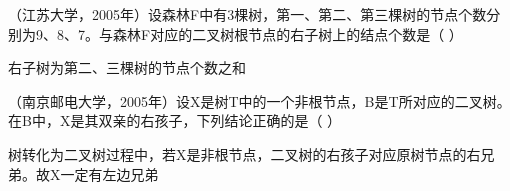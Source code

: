 \question （江苏大学，2005年）设森林F中有3棵树，第一、第二、第三棵树的节点个数分别为9、8、7。与森林F对应的二叉树根节点的右子树上的结点个数是（
）
\par{}
\begin{solution}右子树为第二、三棵树的节点个数之和
\end{solution}
\question （南京邮电大学，2005年）设X是树T中的一个非根节点，B是T所对应的二叉树。在B中，X是其双亲的右孩子，下列结论正确的是（
）
\par{}
\begin{solution}树转化为二叉树过程中，若X是非根节点，二叉树的右孩子对应原树节点的右兄弟。故X一定有左边兄弟
\end{solution}
